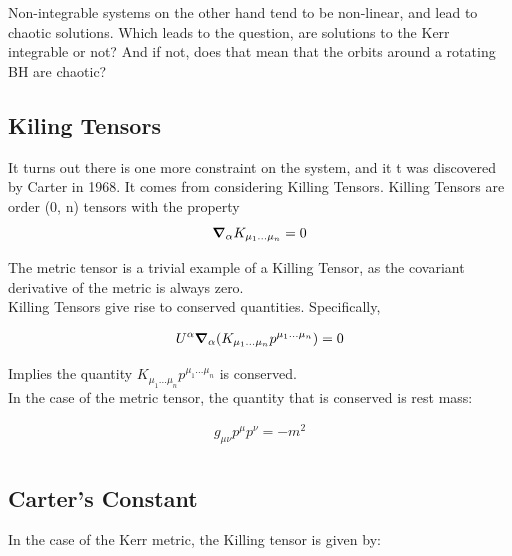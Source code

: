 \documentclass[11pt,table]{article}
\begin{document}
Non-integrable systems on the other hand tend to be non-linear, and lead to chaotic solutions. Which leads to the question, are solutions to the Kerr integrable or not? And if not, does that mean that the orbits around a rotating BH are chaotic? \\

\subsection{Kiling Tensors}

It turns out there is one more constraint on the system, and it t was discovered by Carter in 1968. It comes from considering Killing Tensors. Killing Tensors are order (0, n) tensors with the property 
\begin{equation}
    \gradient_\alpha K_{\mu_1 ... \mu_n} = 0
    \label{eq:KT}
\end{equation}

The metric tensor is a trivial example of a Killing Tensor, as the covariant derivative of the metric is always zero. \\

Killing Tensors give rise to conserved quantities. Specifically, 

\begin{equation}
    \begin{aligned}
    U^\alpha\gradient_\alpha (K_{\mu_1 ... \mu_n}p^{\mu_1 ... \mu_n}) = 0 \\
    \end{aligned}
    \label{eq:KTcons}
\end{equation}

Implies the quantity $K_{\mu_1 ... \mu_n}p^{\mu_1 ... \mu_n}$ is conserved.\\

In the case of the metric tensor, the quantity that is conserved is rest mass:

\begin{equation}
    \begin{aligned}
    g_{\mu\nu}p^\mu p^\nu = -m^2\\
    \end{aligned}
    \label{eq:restMass}
\end{equation}

\subsection{Carter's Constant}

In the case of the Kerr metric, the Killing tensor is given by:
\end{document}
